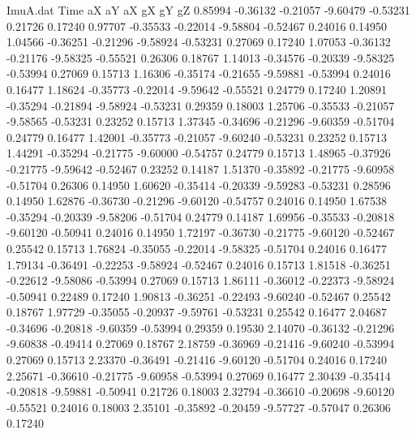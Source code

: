 \begin{filecontents}{ImuA.dat}
Time aX aY aX gX gY gZ
   0.85994   -0.36132   -0.21057   -9.60479   -0.53231    0.21726    0.17240
   0.97707   -0.35533   -0.22014   -9.58804   -0.52467    0.24016    0.14950
   1.04566   -0.36251   -0.21296   -9.58924   -0.53231    0.27069    0.17240
   1.07053   -0.36132   -0.21176   -9.58325   -0.55521    0.26306    0.18767
   1.14013   -0.34576   -0.20339   -9.58325   -0.53994    0.27069    0.15713
   1.16306   -0.35174   -0.21655   -9.59881   -0.53994    0.24016    0.16477
   1.18624   -0.35773   -0.22014   -9.59642   -0.55521    0.24779    0.17240
   1.20891   -0.35294   -0.21894   -9.58924   -0.53231    0.29359    0.18003
   1.25706   -0.35533   -0.21057   -9.58565   -0.53231    0.23252    0.15713
   1.37345   -0.34696   -0.21296   -9.60359   -0.51704    0.24779    0.16477
   1.42001   -0.35773   -0.21057   -9.60240   -0.53231    0.23252    0.15713
   1.44291   -0.35294   -0.21775   -9.60000   -0.54757    0.24779    0.15713
   1.48965   -0.37926   -0.21775   -9.59642   -0.52467    0.23252    0.14187
   1.51370   -0.35892   -0.21775   -9.60958   -0.51704    0.26306    0.14950
   1.60620   -0.35414   -0.20339   -9.59283   -0.53231    0.28596    0.14950
   1.62876   -0.36730   -0.21296   -9.60120   -0.54757    0.24016    0.14950
   1.67538   -0.35294   -0.20339   -9.58206   -0.51704    0.24779    0.14187
   1.69956   -0.35533   -0.20818   -9.60120   -0.50941    0.24016    0.14950
   1.72197   -0.36730   -0.21775   -9.60120   -0.52467    0.25542    0.15713
   1.76824   -0.35055   -0.22014   -9.58325   -0.51704    0.24016    0.16477
   1.79134   -0.36491   -0.22253   -9.58924   -0.52467    0.24016    0.15713
   1.81518   -0.36251   -0.22612   -9.58086   -0.53994    0.27069    0.15713
   1.86111   -0.36012   -0.22373   -9.58924   -0.50941    0.22489    0.17240
   1.90813   -0.36251   -0.22493   -9.60240   -0.52467    0.25542    0.18767
   1.97729   -0.35055   -0.20937   -9.59761   -0.53231    0.25542    0.16477
   2.04687   -0.34696   -0.20818   -9.60359   -0.53994    0.29359    0.19530
   2.14070   -0.36132   -0.21296   -9.60838   -0.49414    0.27069    0.18767
   2.18759   -0.36969   -0.21416   -9.60240   -0.53994    0.27069    0.15713
   2.23370   -0.36491   -0.21416   -9.60120   -0.51704    0.24016    0.17240
   2.25671   -0.36610   -0.21775   -9.60958   -0.53994    0.27069    0.16477
   2.30439   -0.35414   -0.20818   -9.59881   -0.50941    0.21726    0.18003
   2.32794   -0.36610   -0.20698   -9.60120   -0.55521    0.24016    0.18003
   2.35101   -0.35892   -0.20459   -9.57727   -0.57047    0.26306    0.17240

\end{filecontents}
